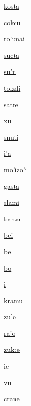 {\hyperlink{val:kosta}{kosta}}{}{}{}

{\hyperlink{val:cokcu}{cokcu}}{}{}{}

{\hyperlink{val:rohunai}{ro'unai}}{}{}{}

{\hyperlink{val:sucta}{sucta}}{}{}{}

{\hyperlink{val:suhu}{su'u}}{}{}{}

{\hyperlink{val:tolzdi}{tolzdi}}{}{}{}

{\hyperlink{val:satre}{satre}}{}{}{}

{\hyperlink{val:xu}{xu}}{}{}{}

{\hyperlink{val:snuti}{snuti}}{}{}{}

{\hyperlink{val:iha}{i'a}}{}{}{}

{\hyperlink{val:mohizohi}{mo'izo'i}}{}{}{}

{\hyperlink{val:gasta}{gasta}}{}{}{}

{\hyperlink{val:slami}{slami}}{}{}{}

{\hyperlink{val:kansa}{kansa}}{}{}{}

{\hyperlink{val:bei}{bei}}{}{}{}

{\hyperlink{val:be}{be}}{}{}{}

{\hyperlink{val:bo}{bo}}{}{}{}

{\hyperlink{val:i}{i}}{}{}{}

{\hyperlink{val:kramu}{kramu}}{}{}{}

{\hyperlink{val:zuho}{zu'o}}{}{}{}

{\hyperlink{val:raho}{ra'o}}{}{}{}

{\hyperlink{val:zukte}{zukte}}{}{}{}

{\hyperlink{val:ie}{ie}}{}{}{}

{\hyperlink{val:vu}{vu}}{}{}{}

{\hyperlink{val:crane}{crane}}{}{}{}


